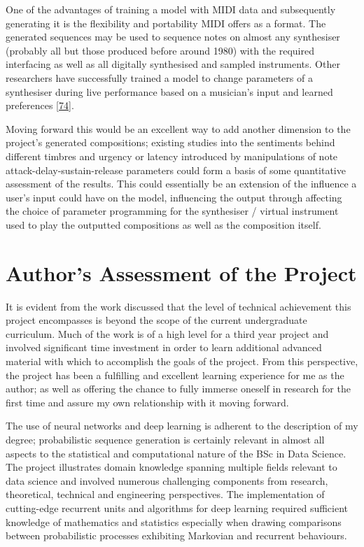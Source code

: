 \documentclass[12pt,]{article}
\begin{document}
One of the advantages of training a model with MIDI data and
subsequently generating it is the flexibility and portability MIDI
offers as a format. The generated sequences may be used to sequence
notes on almost any synthesiser (probably all but those produced before
around 1980) with the required interfacing as well as all digitally
synthesised and sampled instruments. Other researchers have successfully
trained a model to change parameters of a synthesiser during live
performance based on a musician's input and learned preferences
{[}\protect\hyperlink{ref-sommer2014towards}{74}{]}.

Moving forward this would be an excellent way to add another dimension
to the project's generated compositions; existing studies into the
sentiments behind different timbres and urgency or latency introduced by
manipulations of note attack-delay-sustain-release parameters could form
a basis of some quantitative assessment of the results. This could
essentially be an extension of the influence a user's input could have
on the model, influencing the output through affecting the choice of
parameter programming for the synthesiser / virtual instrument used to
play the outputted compositions as well as the composition itself.

\hypertarget{authors-assessment-of-the-project}{%
\section{Author's Assessment of the
Project}\label{authors-assessment-of-the-project}}

It is evident from the work discussed that the level of technical
achievement this project encompasses is beyond the scope of the current
undergraduate curriculum. Much of the work is of a high level for a
third year project and involved significant time investment in order to
learn additional advanced material with which to accomplish the goals of
the project. From this perspective, the project has been a fulfilling
and excellent learning experience for me as the author; as well as
offering the chance to fully immerse oneself in research for the first
time and assure my own relationship with it moving forward.

The use of neural networks and deep learning is adherent to the
description of my degree; probabilistic sequence generation is certainly
relevant in almost all aspects to the statistical and computational
nature of the BSc in Data Science. The project illustrates domain
knowledge spanning multiple fields relevant to data science and involved
numerous challenging components from research, theoretical, technical
and engineering perspectives. The implementation of cutting-edge
recurrent units and algorithms for deep learning required sufficient
knowledge of mathematics and statistics especially when drawing
comparisons between probabilistic processes exhibiting Markovian and
recurrent behaviours.
\end{document}
